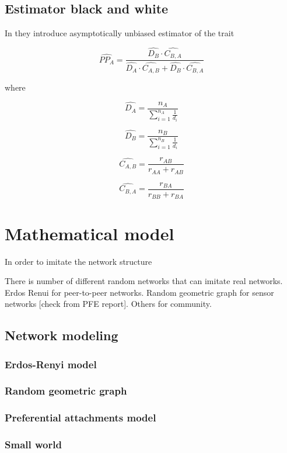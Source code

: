 \documentclass[12pt]{report}
\begin{document}
\section{Estimator black and white}

In \cite{salganik2004sampling} they introduce asymptotically unbiased estimator of the trait

$$ \widehat{PP_A} = \frac{ \widehat{D_B} \cdot \widehat{C_{B, A}}}{ 
\widehat{D_A} \cdot \widehat{C_{A, B}} + \widehat{D_B} \cdot \widehat{C_{B, A}}} $$

where

$$ \widehat{D_A} = \frac{n_A}{ \sum_{i=1}^{n_A} \frac{1}{d_i}} $$

$$ \widehat{D_B} = \frac{n_B}{ \sum_{i=1}^{n_B} \frac{1}{d_i}} $$

$$ \widehat{C_{A, B}} = \frac{r_{AB}}{r_{AA} + r_{AB}} $$

$$ \widehat{C_{B, A}} = \frac{r_{BA}}{r_{BB} + r_{BA}} $$


\chapter{Mathematical model}

In order to imitate the network structure 


There is number of different random networks that can imitate real networks. Erdos Renui for peer-to-peer networks. Random geometric graph for sensor networks [check from PFE report]. Others for community.
\section{Network modeling}

\subsection{Erdos-Renyi model}

\subsection{Random geometric graph}

\subsection{Preferential attachments model}

\subsection{Small world}
\end{document}
